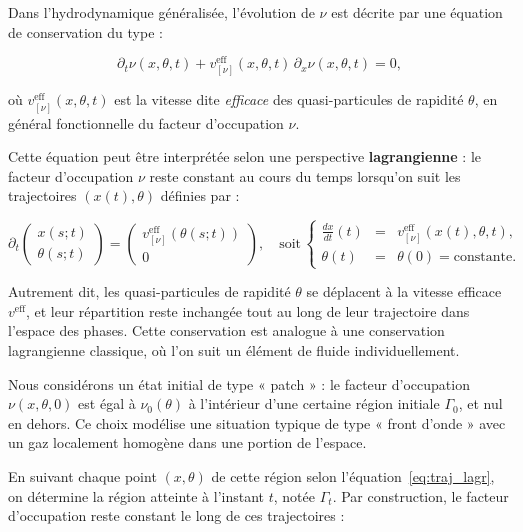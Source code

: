 Dans l’hydrodynamique généralisée, l’évolution de $\nu$ est décrite par une équation de conservation du type :

\begin{equation}
\partial_t \nu(x,\theta,t) + v^{\mathrm{eff}}_{[\nu]}(x,\theta,t)\, \partial_x \nu(x,\theta,t) = 0,
\end{equation}

où $v^{\mathrm{eff}}_{[\nu]}(x,\theta,t)$ est la vitesse dite \textit{efficace} des quasi-particules de rapidité $\theta$, en général fonctionnelle du facteur d’occupation $\nu$.

Cette équation peut être interprétée selon une perspective \textbf{lagrangienne} : le facteur d’occupation $\nu$ reste constant au cours du temps lorsqu’on suit les trajectoires $(x(t), \theta)$ définies par :

\begin{equation}
\label{eq:traj_lagr}
\partial_t \left( \begin{array}{c} x(s;t) \\ \theta(s;t) \end{array} \right)  =  \left( \begin{array}{c} v^{\mathrm{eff}}_{[\nu]}(\theta(s;t)) \\ 0 \end{array} \right), \quad \mbox{soit} \, 
\left\{ \begin{array}{rcl}
\displaystyle \frac{d x}{dt}(t) & = & v^{\mathrm{eff}}_{[\nu]}(x(t), \theta, t), \\
\theta(t) & = & \theta(0) = \text{constante}.
\end{array} \right.
\end{equation}

Autrement dit, les quasi-particules de rapidité $\theta$ se déplacent à la vitesse efficace $v^{\mathrm{eff}}$, et leur répartition reste inchangée tout au long de leur trajectoire dans l’espace des phases. Cette conservation est analogue à une conservation lagrangienne classique, où l’on suit un élément de fluide individuellement.

\medskip

Nous considérons un état initial de type « patch » : le facteur d’occupation $\nu(x,\theta,0)$ est égal à $\nu_0(\theta)$ à l’intérieur d’une certaine région initiale $\Gamma_0$, et nul en dehors. Ce choix modélise une situation typique de type « front d’onde » avec un gaz localement homogène dans une portion de l’espace.

En suivant chaque point $(x,\theta)$ de cette région selon l’équation~\eqref{eq:traj_lagr}, on détermine la région atteinte à l’instant $t$, notée $\Gamma_t$. Par construction, le facteur d’occupation reste constant le long de ces trajectoires :

